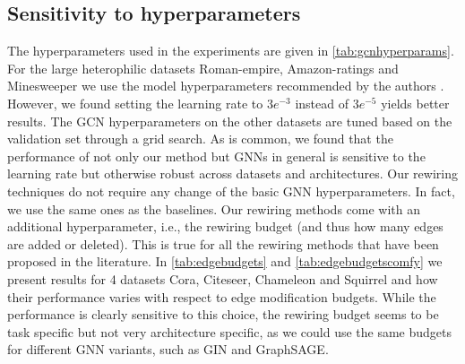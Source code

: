 \subsection{Sensitivity to hyperparameters}\label{app:hyperparameters}
The hyperparameters used in the experiments are given in \autoref{tab:gcnhyperparams}. For the large heterophilic datasets Roman-empire, Amazon-ratings and Minesweeper we use the model hyperparameters recommended by the authors \citep{platonov2023characterizing}. However, we found setting the learning rate to $3e^{-3}$ instead of $3e^{-5}$ yields better results. The GCN hyperparameters on the other datasets are tuned based on the validation set through a grid search. As is common, we found that the performance of not only our method but GNNs in general is sensitive to the learning rate but otherwise robust across datasets and architectures. Our rewiring techniques do not require any change of the basic GNN hyperparameters. In fact, we use the same ones as the baselines. Our rewiring methods come with an additional hyperparameter, i.e., the rewiring budget (and thus how many edges are added or deleted). This is true for all the rewiring methods that have been proposed \citep{topping2022understanding,Fosr,sjlr,borf,effectiveresistance,jamadandi2024spectral} in the literature. In \autoref{tab:edgebudgets} and \autoref{tab:edgebudgetscomfy}  we present results for 4 datasets Cora, Citeseer, Chameleon and Squirrel and how their performance varies with respect to edge modification budgets. While the performance is clearly sensitive to this choice, the rewiring budget seems to be task specific but not very architecture specific, as we could use the same budgets for different GNN variants, such as GIN and GraphSAGE.




